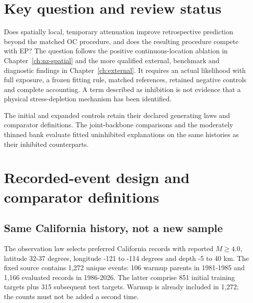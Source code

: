 \section{Key question and review status}

Does spatially local, temporary attenuation improve retrospective prediction beyond the matched OC procedure, and does the resulting procedure compete with EP? The question follows the positive continuous-location ablation in Chapter~\ref{ch:nz-spatial} and the more qualified external, benchmark and diagnostic findings in Chapter~\ref{ch:external}. It requires an actual likelihood with full exposure, a frozen fitting rule, matched references, retained negative controls and complete accounting. A term described as inhibition is not evidence that a physical stress-depletion mechanism has been identified.

The initial and expanded controls retain their declared generating laws and comparator definitions. The joint-backbone comparisons and the moderately thinned bank evaluate fitted uninhibited explanations on the same histories as their inhibited counterparts.

\section{Recorded-event design and comparator definitions}

\subsection{Same California history, not a new sample}

The observation law selects preferred California records with reported $M\geq 4.0$, latitude 32-37 degrees, longitude -121 to -114 degrees and depth -5 to 40 km. The fixed source contains 1,272 unique events: 106 warmup parents in 1981-1985 and 1,166 evaluated records in 1986-2026. The latter comprise 851 initial training targets plus 315 subsequent test targets. Warmup is already included in 1,272; the counts must not be added a second time.

